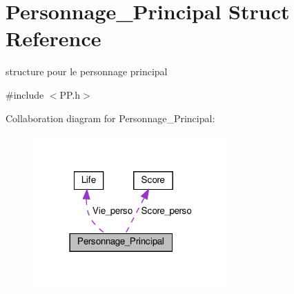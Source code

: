\hypertarget{structPersonnage__Principal}{}\section{Personnage\+\_\+\+Principal Struct Reference}
\label{structPersonnage__Principal}


structure pour le personnage principal  




{\ttfamily \#include $<$P\+P.\+h$>$}



Collaboration diagram for Personnage\+\_\+\+Principal\+:
\nopagebreak
\begin{figure}[H]
\begin{center}
\leavevmode
\includegraphics[width=213pt]{structPersonnage__Principal__coll__graph}
\end{center}
\end{figure}
